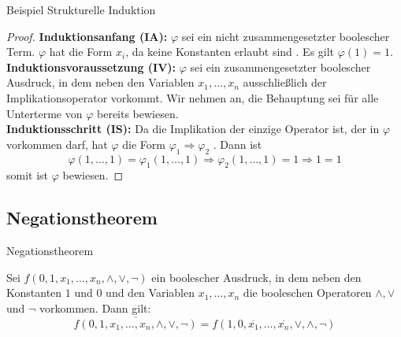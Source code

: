 \documentclass[12pt%
,aspectratio=169%
]{beamer}
\begin{document}
\begin{frame}{Beispiel Strukturelle Induktion}

\begin{proof}
\textbf{Induktionsanfang (IA):} $\varphi$ sei ein nicht zusammengesetzter boolescher Term. $\varphi$ hat die Form $x_i$, da keine Konstanten erlaubt sind . Es gilt $\varphi(1) = 1$.\\
\textbf{Induktionsvoraussetzung (IV):} $\varphi$ sei ein zusammengesetzter boolescher Ausdruck, in dem neben den Variablen $x_1, \ldots, x_n$ ausschließlich der Implikationsoperator vorkommt. Wir nehmen an, die Behauptung sei für alle Unterterme von $\varphi$ bereits bewiesen.\\
\textbf{Induktionsschritt (IS):} Da die Implikation der einzige Operator ist, der in $\varphi$ vorkommen darf, hat $\varphi$ die Form $\varphi_1 \Rightarrow \varphi_2$ . Dann ist
$$
\varphi(1,\ldots, 1) = \varphi_1(1, \ldots , 1) \Rightarrow \varphi_2(1, \ldots, 1) = 1 \Rightarrow 1 = 1
$$
somit ist $\varphi$ bewiesen.
\end{proof}
\end{frame}

\subsection{Negationstheorem}
\begin{frame}{Negationstheorem}
\begin{theorem}[Negationstheorem]
Sei $f(0, 1, x_1 , \ldots , x_n , \land, \lor, \neg)$ ein boolescher Ausdruck, in dem neben den Konstanten $1$ und $0$ und den Variablen $x_1 ,\ldots, x_n$ die booleschen Operatoren $\land, \lor$ und $\neg$ vorkommen. Dann gilt:
$$
	\overline{f(0, 1, x_1 , \ldots , x_n , \land, \lor, \neg)} = f(1, 0, \overline{x_1}, \ldots ,\overline{x_n} ,\lor, \land, \neg)
$$
\end{theorem}
\end{frame}
\end{document}
